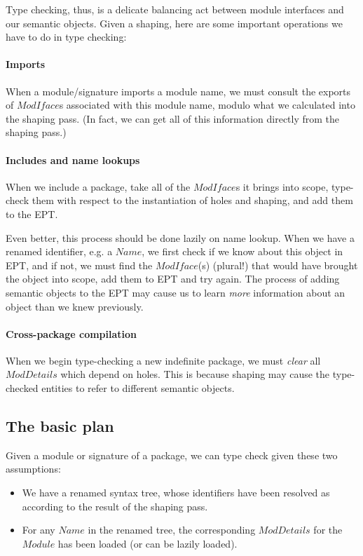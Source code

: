 \documentclass{article}
\newcommand{\I}[1]{\ensuremath{\mathit{#1}}}
\begin{document}
Type checking, thus, is a delicate balancing act between module
interfaces and our semantic objects.  Given a shaping, here
are some important operations we have to do in type checking:

\paragraph{Imports}  When a module/signature imports a module name,
we must consult the exports of \I{ModIface}s associated with this
module name, modulo what we calculated into the shaping pass.
(In fact, we can get all of this information directly from the
shaping pass.)

\paragraph{Includes and name lookups}  When we include a package,
take all of the \I{ModIface}s it brings into scope, type-check
them with respect to the instantiation of holes and shaping, and add
them to the EPT.

Even better, this process should be done lazily on name lookup.
When we have a renamed identifier, e.g. a \I{Name},
we first check if we know about this object in EPT, and if not,
we must find the \I{ModIface}(s) (plural!) that would have brought the object into
scope, add them to EPT and try again.  The process of adding semantic
objects to the EPT may cause us to learn \emph{more} information
about an object than we knew previously.

\paragraph{Cross-package compilation}  When we begin type-checking a new
indefinite package, we must \emph{clear} all \I{ModDetails} which depend on
holes.  This is because shaping may cause the type-checked entities to refer
to different semantic objects.

\subsection{The basic plan}

Given a module or signature of a package, we can type check given these two assumptions:

\begin{itemize}
    \item We have a renamed syntax tree, whose identifiers have been
          resolved as according to the result of the shaping pass.
    \item For any \I{Name} in the renamed tree, the corresponding
          \I{ModDetails} for the \I{Module} has been loaded
          (or can be lazily loaded).
\end{itemize}
\end{document}
